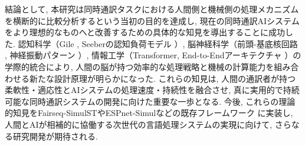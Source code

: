 結論として, 本研究は同時通訳タスクにおける人間側と機械側の処理メカニズムを横断的に比較分析するという当初の目的を達成し, 現在の同時通訳AIシステムをより理想的なものへと改善するための具体的な知見を導出することに成功した.
認知科学（Gile \cite{gile1995basic}, Seeberの認知負荷モデル \cite{seeber2011cognitive}）, 脳神経科学（前頭-基底核回路 \cite{hervais2015fmri}, 神経振動パターン \cite{elmer2016functional}）, 情報工学（Transformer, End-to-Endアーキテクチャ \cite{liu2024recent}）の学際的統合により, 人間の脳が持つ効率的な処理戦略と機械の計算能力を組み合わせる新たな設計原理が明らかになった.
これらの知見は, 人間の通訳者が持つ柔軟性・適応性とAIシステムの処理速度・持続性を融合させ, 真に実用的で持続可能な同時通訳システムの開発に向けた重要な一歩となる.
今後, これらの理論的知見をFairseq-SimulSTやESPnet-Simulなどの既存フレームワーク \cite{wang2020fairseqs2t,yan2023espnet} に実装し, 人間とAIが相補的に協働する次世代の言語処理システムの実現に向けて, さらなる研究開発が期待される.